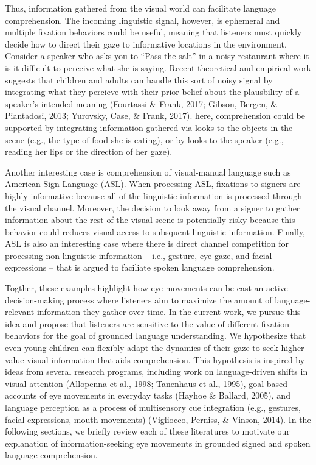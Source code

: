 \documentclass[english,floatsintext,man]{apa6}
\begin{document}
Thus, information gathered from the visual world can facilitate language
comprehension. The incoming linguistic signal, however, is ephemeral and
multiple fixation behaviors could be useful, meaning that listeners must
quickly decide how to direct their gaze to informative locations in the
environment. Consider a speaker who asks you to \enquote{Pass the salt}
in a noisy restaurant where it is it difficult to perceive what she is
saying. Recent theoretical and empirical work suggests that children and
adults can handle this sort of noisy signal by integrating what they
percieve with their prior belief about the plausbility of a speaker's
intended meaning (Fourtassi \& Frank, 2017; Gibson, Bergen, \&
Piantadosi, 2013; Yurovsky, Case, \& Frank, 2017). here, comprehension
could be supported by integrating information gathered via looks to the
objects in the scene (e.g., the type of food she is eating), or by looks
to the speaker (e.g., reading her lips or the direction of her gaze).

Another interesting case is comprehension of visual-manual language such
as American Sign Language (ASL). When processing ASL, fixations to
signers are highly informative because all of the linguistic information
is processed through the visual channel. Moreover, the decision to look
away from a signer to gather information about the rest of the visual
scene is potentially risky because this behavior could reduces visual
access to subsquent linguistic information. Finally, ASL is also an
interesting case where there is direct channel competition for
processing non-linguistic information -- i.e., gesture, eye gaze, and
facial expressions -- that is argued to faciliate spoken language
comprehension.

Togther, these examples highlight how eye movements can be cast an
active decision-making process where listeners aim to maximize the
amount of language-relevant information they gather over time. In the
current work, we pursue this idea and propose that listeners are
sensitive to the value of different fixation behaviors for the goal of
grounded language understanding. We hypothesize that even young children
can flexibly adapt the dynamics of their gaze to seek higher value
visual information that aids comprehension. This hypothesis is inspired
by ideas from several research programs, including work on
language-driven shifts in visual attention (Allopenna et al., 1998;
Tanenhaus et al., 1995), goal-based accounts of eye movements in
everyday tasks (Hayhoe \& Ballard, 2005), and language perception as a
process of multisensory cue integration (e.g., gestures, facial
expressions, mouth movements) (Vigliocco, Perniss, \& Vinson, 2014). In
the following sections, we briefly review each of these literatures to
motivate our explanation of information-seeking eye movements in
grounded signed and spoken language comprehension.
\end{document}
